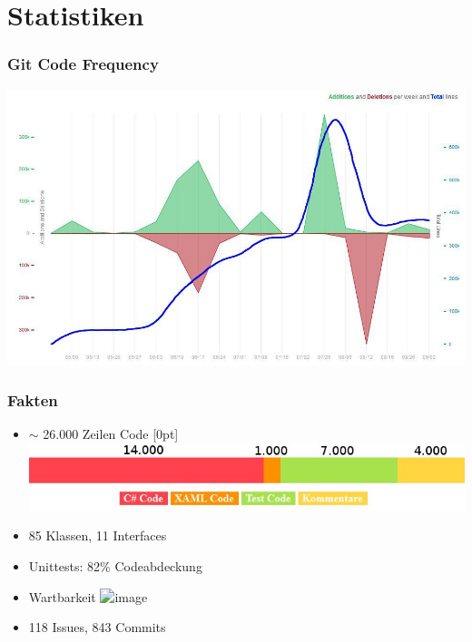 \documentclass[t]{beamer}
\begin{document}
\section{Statistiken}
\begin{frame}
	\frametitle{Git Code Frequency}
	\includegraphics[scale=.33]{img/GitCodeFrequency.jpg}
\end{frame}
\begin{frame}[c]
	\frametitle{Fakten}
	\begin{itemize}
	\itemsep1em
        \item <+-> \begin{math}\sim\end{math} 26.000 Zeilen Code \raisebox{-1.5cm}[0pt]{\includegraphics[scale=.5]{img/BarDiagramm-Zeilen.jpg}} %
			\item <+-> 85 Klassen, 11 Interfaces
		\item <+-> Unittests: 82\% Codeabdeckung %
		\item <+-> Wartbarkeit
		\includegraphics<4->[scale=.05]{img/DaumenHoch.jpg}
		\item <+-> 118 Issues, 843 Commits 
		\end{itemize}
		
	
\end{frame}
\end{document}

